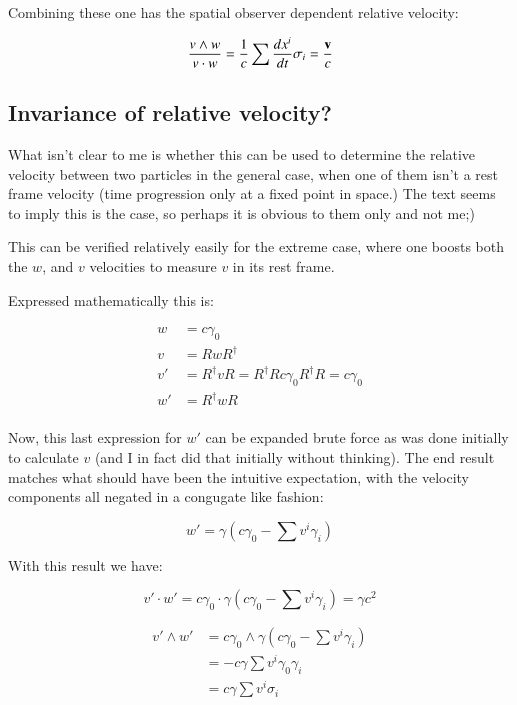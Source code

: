 \documentclass{article}      %
\begin{document}
Combining these one has the spatial observer dependent relative velocity:

\begin{equation}
\frac{v \wedge w}{v \cdot w} = \frac{1}{c} \sum \frac{d x^{i}}{dt} \sigma_{i} = \frac{\mathbf{v}}{c}
\end{equation}

\subsection{ Invariance of relative velocity? }

What isn't clear to me is whether this can be used to determine the relative velocity between two particles in the general case, when one of them isn't a rest frame velocity (time progression only at a fixed point in space.)
The text seems
to imply this is the case, so perhaps it is obvious to them only and not me;)

This can be verified relatively easily for the extreme case, where one boosts both the $w$, and $v$ velocities to measure $v$ in its rest frame.

Expressed mathematically this is:

\begin{align*}
w &= c \gamma_0 \\
v &= R w R^\dagger \\
v' &= R^\dagger v R = R^\dagger R c \gamma_0 R^\dagger R = c \gamma_0 \\
w' &= R^\dagger w R \\
\end{align*}

Now, this last expression for $w'$ can be expanded brute force as was done initially to calculate $v$ (and I in
fact did that initially without thinking).  The end result matches what should have been the intuitive expectation, with the velocity components all negated in a congugate like fashion:

\begin{equation*}
w' = \gamma\left( c\gamma_0 - \sum v^i \gamma_i \right)
\end{equation*}

With this result we have:

\begin{equation*}
v' \cdot w' = c \gamma_0 \cdot \gamma\left( c\gamma_0 - \sum v^i \gamma_i \right) = \gamma c^2
\end{equation*}

\begin{align*}
v' \wedge w' 
&= c \gamma_0 \wedge \gamma\left( c\gamma_0 - \sum v^i \gamma_i \right) \\
&= -c \gamma \sum v^i \gamma_0 \gamma_i \\
&= c \gamma \sum v^i \sigma_i \\
\end{align*}
\end{document}
